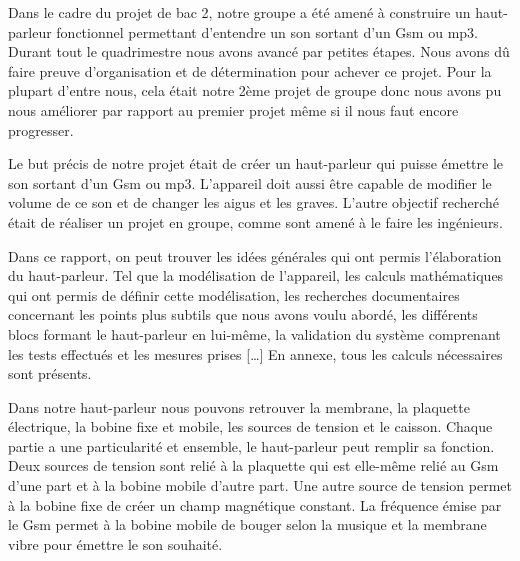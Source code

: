 



Dans le cadre du projet de bac 2, notre groupe a été amené à construire un haut-parleur fonctionnel permettant d’entendre un son sortant d’un Gsm ou mp3.  Durant tout le quadrimestre nous avons avancé par petites étapes.  Nous avons dû faire preuve d’organisation et de détermination pour achever ce projet.  Pour la plupart d’entre nous, cela était notre 2ème projet de groupe donc nous avons pu nous améliorer par rapport au premier projet même si il nous faut encore progresser. 

Le but précis de notre projet était de créer un haut-parleur qui puisse émettre le son sortant d’un Gsm ou mp3.  L’appareil doit aussi être capable de modifier le volume de ce son et de changer les aigus et les graves.  L’autre objectif recherché était de réaliser un projet en groupe, comme sont amené à le faire les ingénieurs.  

Dans ce rapport, on peut trouver les idées générales qui ont permis l’élaboration du haut-parleur.  Tel que la modélisation de l’appareil, les calculs mathématiques qui ont permis de définir cette modélisation, les recherches documentaires concernant les points plus subtils que nous avons voulu abordé, les différents blocs formant le haut-parleur en lui-même, la validation du système comprenant les tests effectués et les mesures prises […]  En annexe, tous les calculs nécessaires sont présents.

Dans notre haut-parleur nous pouvons retrouver la membrane, la plaquette électrique, la bobine fixe et mobile, les sources de tension et le caisson.  Chaque partie a une particularité et ensemble, le haut-parleur peut remplir sa fonction.  Deux sources de tension sont relié à la plaquette qui est elle-même relié au Gsm d’une part et à la bobine mobile d’autre part.  Une autre source de tension permet à la bobine fixe de créer un champ magnétique constant.  La fréquence émise par le Gsm permet à la bobine mobile de bouger selon la musique et la membrane vibre pour émettre le son souhaité.



